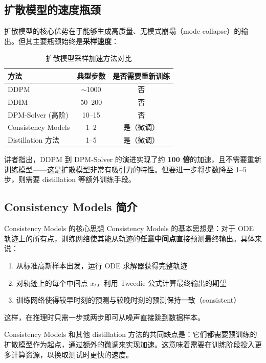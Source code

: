 \documentclass[a4paper]{article}
\begin{document}
\subsection{扩散模型的速度瓶颈}

扩散模型的核心优势在于能够生成高质量、无模式崩塌（mode collapse）的输出。但其主要瓶颈始终是\textbf{采样速度}：

\begin{table}[H]
\centering
\begin{tabular}{lcc}
\toprule
\textbf{方法} & \textbf{典型步数} & \textbf{是否需要重新训练} \\
\midrule
DDPM & $\sim$1000 & 否 \\
DDIM & 50--200 & 否 \\
DPM-Solver (高阶) & 10--15 & 否 \\
Consistency Models & 1--2 & 是（微调） \\
Distillation 方法 & 1--5 & 是（微调） \\
\bottomrule
\end{tabular}
\caption{扩散模型采样加速方法对比}
\end{table}

讲者指出，DDPM 到 DPM-Solver 的演进实现了约 \textbf{100 倍}的加速，且不需要重新训练模型——这是扩散模型非常有吸引力的特性。但要进一步将步数降至 1--5 步，则需要 distillation 等额外训练手段。

\subsection{Consistency Models 简介}

\begin{importantbox}{Consistency Models 的核心思想}
Consistency Models 的基本思想是：对于 ODE 轨迹上的所有点，训练网络使其能从轨迹的\textbf{任意中间点}直接预测最终输出。具体来说：
\begin{enumerate}
    \item 从标准高斯样本出发，运行 ODE 求解器获得完整轨迹
    \item 对轨迹上的每个中间点 $x_t$，利用 Tweedie 公式计算最终输出的期望
    \item 训练网络使得较早时刻的预测与较晚时刻的预测保持一致（consistent）
\end{enumerate}
这样，在推理时只需一步或两步即可从噪声直接跳到数据样本。
\end{importantbox}

Consistency Models 和其他 distillation 方法的共同缺点是：它们都需要预训练的扩散模型作为起点，通过额外的微调来实现加速。这意味着需要在训练阶段投入更多计算资源，以换取测试时更快的速度。
\end{document}
